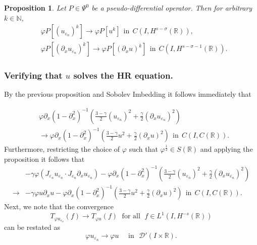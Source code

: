\documentclass{beamer}
\newcommand{\rr}{\mathbb{R}}
\newcommand{\p}{\partial}
\newcommand{\ee}{\varepsilon}
\newcommand{\vp}{\varphi}
\newtheorem{proposition}{Proposition}
\begin{document}
  \begin{frame}
		\begin{proposition}
		\label{hhthm:crit1}
		Let $P \in \Psi^0$ be a pseudo-differential operator. Then for
		arbitrary $k \in \mathbb{N}$, 
			\begin{equation}
			\begin{split}
				& \vp P [(u_{\ee_n})^k] \to \vp P [u^k] \ \ \text{in}  \ \ C(I,
				H^{s-\sigma }(\rr)),
				\\
				& 
				\vp P [(\p_x u_{\ee_n})^k] \to \vp P [(\p_x u)^k] \ \
				\text{in}  \ \ C(I,
				H^{s-\sigma -1}(\rr)).
				\label{hhdx_vp_u_ep_conv}
			\end{split}
		\end{equation}
	\end{proposition}
		\vskip0.1in
  \end{frame}
  \begin{frame}
    \frametitle{Verifying that $u$ solves the HR equation.} 
    	By the previous proposition and Sobolev Imbedding it follows immediately that
\end{frame}
\begin{frame}
		\begin{equation}
			\begin{split}
				& \vp \p_x(1- \p_x^2)^{-1} \left( \frac{3-\gamma}{2}
				(u_{\ee_n})^2
				 + \frac{\gamma}{2} (\p_x u_{\ee_n})^2 \right )
				 \\
				 & \to
				 \vp \p_x(1- \p_x^2)^{-1} \left( \frac{3-\gamma}{2} u^2
				 + \frac{\gamma}{2} (\p_x u)^2 \right ) \ \
				 \text{in} \ \ C(I, C(\rr)).
				\label{llnon-local-convergence}
			\end{split}
		\end{equation}
		Furthermore, restricting the
		choice of $\vp$ such that $\vp^\frac{1}{2} \in S(\rr)$ and applying the
    proposition it follows that
		\begin{equation}
			\begin{split}
				& -\gamma \vp (J_{\ee_n} u_{\ee_n} \cdot J_{\ee_n} \p_x
				u_{\ee_n}) -
				\vp \p_x(1- \p_x^2)^{-1} \left( \frac{3-\gamma}{2}
				(u_{\ee_n})^2
				 + \frac{\gamma}{2} (\p_x u_{\ee_n})^2 \right )
				 \\
				 \to & -\gamma \vp u \p_x u -
				 \vp \p_x(1- \p_x^2)^{-1} \left( \frac{3-\gamma}{2} u^2
				 + \frac{\gamma}{2} (\p_x u)^2 \right ) \ \
				 \text{in} \ \ C(I, C(\rr)).
				\label{llloc-non-loc-tog}
			\end{split}
		\end{equation}
		Next, we note that the convergence  
		\begin{equation}
			\label{hhweak-conv-2}
			T_{\vp u_{\ee_n}}(f)  \longrightarrow  T_{\vp u} (f) \;
			\text{ for all } \;  f \in L^1(I, H^{-s}(\rr))
		\end{equation}
		can be restated as 
		\begin{equation}
			\vp u_{\ee_n}  \longrightarrow  \vp u
			\quad
			\text{ in }  \,\,
			\mathcal{D}'(I\times \rr).
		\end{equation}
    \end{frame}
\end{document}
